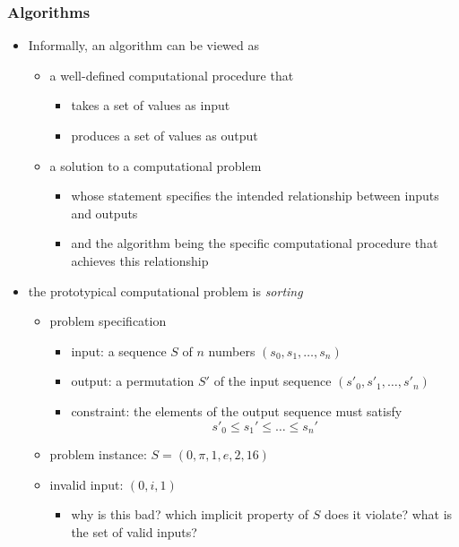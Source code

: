 %
%
%
%


\begin{frame}[fragile]
%
  \frametitle{Algorithms}
%
  \begin{itemize}
%
  \item Informally, an algorithm can be viewed as
    \begin{itemize}
    \item a well-defined computational procedure that
      \begin{itemize}
      \item takes a set of values as input
      \item produces a set of values as output
      \end{itemize}
    \item a solution to a computational problem
      \begin{itemize}
      \item whose statement specifies the intended relationship between inputs and outputs
      \item and the algorithm being the specific computational procedure that achieves this
        relationship
      \end{itemize}
    \end{itemize}
%
  \item the prototypical computational problem is {\em sorting}
    \begin{itemize}
    \item problem specification
      \begin{itemize}
      \item input: a sequence $S$ of $n$ numbers $(s_{0}, s_{1}, \ldots, s_{n})$
      \item output: a permutation $S'$ of the input sequence $(s'_{0}, s'_{1}, \ldots, s'_{n})$
      \item constraint: the elements of the output sequence must satisfy 
        \[ s'_{0} \leq s_{1}' \leq \ldots \leq s_{n}'\]
      \end{itemize}
    \item problem instance: $S = (0, \pi, 1, e, 2, 16)$
    \item invalid input: $(0, i, 1)$
      \begin{itemize}
      \item why is this bad? which implicit property of $S$ does it violate?  what is the set
        of valid inputs?
      \end{itemize}
    \end{itemize}
%
  \end{itemize}
%
\end{frame}

